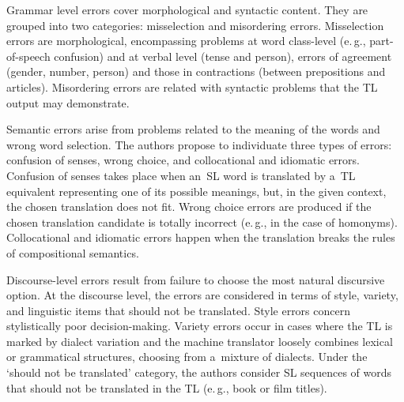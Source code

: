 \begin{multicols}{2}
  Grammar level errors cover morphological and syntactic content. They are 
grouped into two categories: misselection and misordering errors. Misselection 
errors are morphological, encompassing problems at word class-level (e.\,g.,  
part-of-speech confusion) and at verbal level (tense and person), errors of 
agreement (gender, number, person) and those in contractions (between 
prepositions and articles). Misordering errors are related with syntactic problems 
that the TL output may demonstrate.
  
  Semantic errors arise from problems related to the meaning of the words and 
wrong word selection. The authors propose to individuate three types of errors: 
confusion of senses, wrong choice, and collocational and idiomatic errors. Confusion 
of senses takes place when an~SL word is translated by a~TL equivalent representing 
one of its possible meanings, but, in the given context, the chosen translation does 
not fit. Wrong choice errors are produced if the chosen translation candidate is 
totally incorrect (e.\,g., in the case of homonyms). Collocational and idiomatic 
errors happen when the translation breaks the rules of compositional semantics.
{ %

}
  
  Discourse-level errors result from failure to choose the most natural discursive 
option. At the discourse level, the errors are considered in terms of style, variety, 
and linguistic items that should not be translated. Style errors concern stylistically 
poor decision-making. Variety errors occur in cases where the TL is marked by 
dialect variation and the machine translator loosely combines lexical or 
grammatical structures, choosing from a~mixture of dialects. Under the 
`should not 
be translated' category, the authors consider SL sequences of words that should not 
be translated in the TL (e.\,g., book or film titles).
  

\end{multicols}
